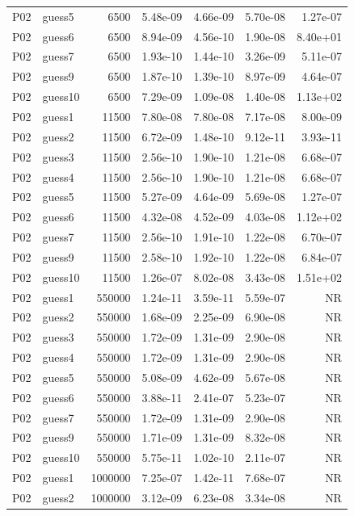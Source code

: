 {\begin{longtable}{llrrrrr}
P02 & guess5 & 6500 & 5.48e-09 & 4.66e-09 & 5.70e-08 & 1.27e-07 \\
P02 & guess6 & 6500 & 8.94e-09 & 4.56e-10 & 1.90e-08 & 8.40e+01 \\
P02 & guess7 & 6500 & 1.93e-10 & 1.44e-10 & 3.26e-09 & 5.11e-07 \\
P02 & guess9 & 6500 & 1.87e-10 & 1.39e-10 & 8.97e-09 & 4.64e-07 \\
P02 & guess10 & 6500 & 7.29e-09 & 1.09e-08 & 1.40e-08 & 1.13e+02 \\
P02 & guess1 & 11500 & 7.80e-08 & 7.80e-08 & 7.17e-08 & 8.00e-09 \\
P02 & guess2 & 11500 & 6.72e-09 & 1.48e-10 & 9.12e-11 & 3.93e-11 \\
P02 & guess3 & 11500 & 2.56e-10 & 1.90e-10 & 1.21e-08 & 6.68e-07 \\
P02 & guess4 & 11500 & 2.56e-10 & 1.90e-10 & 1.21e-08 & 6.68e-07 \\
P02 & guess5 & 11500 & 5.27e-09 & 4.64e-09 & 5.69e-08 & 1.27e-07 \\
P02 & guess6 & 11500 & 4.32e-08 & 4.52e-09 & 4.03e-08 & 1.12e+02 \\
P02 & guess7 & 11500 & 2.56e-10 & 1.91e-10 & 1.22e-08 & 6.70e-07 \\
P02 & guess9 & 11500 & 2.58e-10 & 1.92e-10 & 1.22e-08 & 6.84e-07 \\
P02 & guess10 & 11500 & 1.26e-07 & 8.02e-08 & 3.43e-08 & 1.51e+02 \\
P02 & guess1 & 550000 & 1.24e-11 & 3.59e-11 & 5.59e-07 & NR \\
P02 & guess2 & 550000 & 1.68e-09 & 2.25e-09 & 6.90e-08 & NR \\
P02 & guess3 & 550000 & 1.72e-09 & 1.31e-09 & 2.90e-08 & NR \\
P02 & guess4 & 550000 & 1.72e-09 & 1.31e-09 & 2.90e-08 & NR \\
P02 & guess5 & 550000 & 5.08e-09 & 4.62e-09 & 5.67e-08 & NR \\
P02 & guess6 & 550000 & 3.88e-11 & 2.41e-07 & 5.23e-07 & NR \\
P02 & guess7 & 550000 & 1.72e-09 & 1.31e-09 & 2.90e-08 & NR \\
P02 & guess9 & 550000 & 1.71e-09 & 1.31e-09 & 8.32e-08 & NR \\
P02 & guess10 & 550000 & 5.75e-11 & 1.02e-10 & 2.11e-07 & NR \\
P02 & guess1 & 1000000 & 7.25e-07 & 1.42e-11 & 7.68e-07 & NR \\
P02 & guess2 & 1000000 & 3.12e-09 & 6.23e-08 & 3.34e-08 & NR \\

\end{longtable}}
